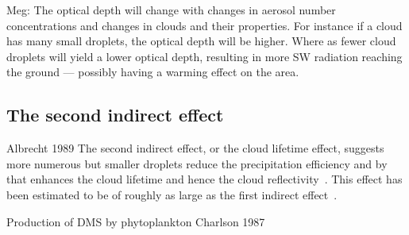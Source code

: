 Meg: The optical depth will change with changes in aerosol number concentrations and changes in clouds and their properties. For instance if a cloud has many small droplets, the optical depth will be higher. Where as  fewer cloud droplets will yield a lower optical depth, resulting in more SW radiation reaching the ground — possibly having a warming effect on the area. 


\subsection{The second indirect effect}
Albrecht 1989 
The second indirect effect, or the cloud lifetime effect, suggests more numerous but smaller droplets reduce the precipitation efficiency and by that enhances the cloud lifetime and hence the cloud reflectivity~\citep{Albrecht1989}. This effect has been estimated to be of roughly as large as the first indirect effect~\citep{Lohmann2005}.


Production of DMS by phytoplankton Charlson 1987


